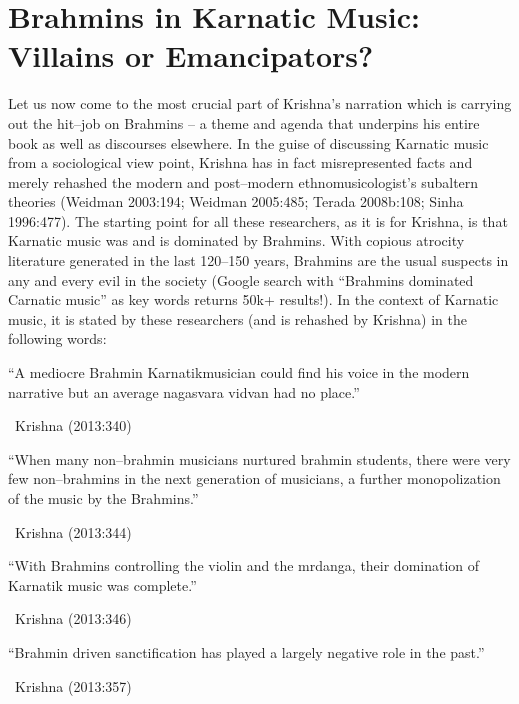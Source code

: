 \section*{Brahmins in Karnatic Music: Villains or Emancipators?}

Let us now come to the most crucial part of Krishna’s narration which is carrying out the hit–job on Brahmins – a theme and agenda that underpins his entire book as well as discourses elsewhere. In the guise of discussing Karnatic music from a sociological view point, Krishna has in fact misrepresented facts and merely rehashed the modern and post–modern ethnomusicologist’s subaltern theories (Weidman 2003:194; Weidman 2005:485; Terada 2008b:108; Sinha 1996:477). The starting point for all these researchers, as it is for Krishna, is that Karnatic music was and is dominated by Brahmins. With copious atrocity literature generated in the last 120–150 years, Brahmins are the usual suspects in any and every evil in the society (Google search with “Brahmins dominated Carnatic music” as key words returns 50k+ results!). In the context of Karnatic music, it is stated by these researchers (and is rehashed by Krishna) in the following words:

\begin{myquote}
“A mediocre Brahmin Karnatikmusician could find his voice in the modern narrative but an average nagasvara vidvan had no place.” 

~\hfill Krishna (2013:340)
\end{myquote}

\begin{myquote}
“When many non–brahmin musicians nurtured brahmin students, there were very few non–brahmins in the next generation of musicians, a further monopolization of the music by the Brahmins.” 

~\hfill Krishna (2013:344)
\end{myquote}

\begin{myquote}
“With Brahmins controlling the violin and the mrdanga, their domination of Karnatik music was complete.” 

~\hfill Krishna (2013:346)
\end{myquote}

\begin{myquote}
“Brahmin driven sanctification has played a largely negative role in the past.” 

~\hfill Krishna (2013:357)
\end{myquote}

